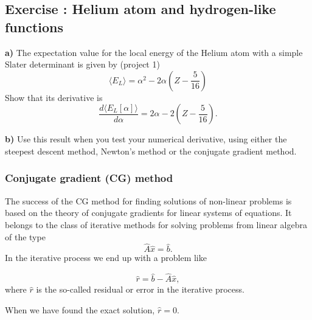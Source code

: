 \documentclass{beamer}
\newenvironment{doconceexercise}{}{}
\newcounter{doconceexercisecounter}
\newcounter{doconce:movie:counter}
\newcommand{\subex}[1]{\noindent\textbf{#1}}  %
\begin{document}
\begin{frame}

\begin{doconceexercise}

\subsection*{Exercise \thedoconceexercisecounter: Helium atom and hydrogen-like functions}



\subex{a)}
The expectation value for the local energy of the Helium atom with a simple Slater determinant is given by (project 1)
\[
\langle E_{L} \rangle = \alpha^2-2\alpha\left(Z-\frac{5}{16}\right)
\]
Show that its derivative is 
\begin{equation*}
\frac{d\langle E_{L}[\alpha] \rangle}{d\alpha} = 2\alpha-2\left(Z-\frac{5}{16}\right).
\end{equation*}

\subex{b)}
Use this result when you test your numerical derivative, using either the steepest descent method, Newton's method or the conjugate
gradient method.




\end{doconceexercise}
\end{frame}

\begin{frame}
\frametitle{Conjugate gradient (CG) method}

\begin{block}{}
The success of the CG method  for finding solutions of non-linear problems is based
on the theory of conjugate gradients for linear systems of equations. It belongs
to the class of iterative methods for solving problems from linear algebra of the type
\begin{equation*}
  \hat{A}\hat{x} = \hat{b}.
\end{equation*}
In the iterative process we end up with a problem like

\begin{equation*}
  \hat{r}= \hat{b}-\hat{A}\hat{x},
\end{equation*}
where $\hat{r}$ is the so-called residual or error in the iterative process.

When we have found the exact solution, $\hat{r}=0$.
\end{block}
\end{frame}
\end{document}
